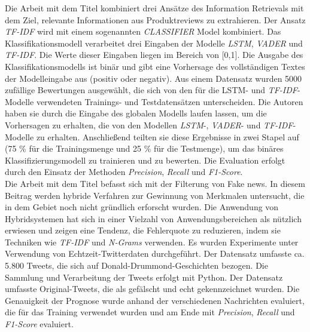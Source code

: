 Die Arbeit mit dem Titel \cite{chiny2021lstm} kombiniert drei Ansätze des Information Retrievals mit dem Ziel, relevante Informationen aus Produktreviews zu extrahieren. Der Ansatz \emph{TF-IDF} wird mit einem sogenannten \emph{CLASSIFIER} Model kombiniert. Das Klassifikationsmodell verarbeitet drei Eingaben der Modelle \emph{LSTM}, \emph{VADER} und \emph{TF-IDF}. Die Werte dieser Eingaben liegen im Bereich von [0,1]. Die Ausgabe des Klassifikationsmodells ist binär und gibt eine Vorhersage des vollständigen Textes der Modelleingabe aus (positiv oder negativ). Aus einem Datensatz wurden 5000 zufällige Bewertungen ausgewählt, die sich von den für die LSTM- und \emph{TF-IDF}-Modelle verwendeten Trainings- und Testdatensätzen unterscheiden. Die Autoren \citeauthor{chiny2021lstm} haben sie durch die Eingabe des globalen Modells laufen lassen, um die Vorhersagen zu erhalten, die von den Modellen \emph{LSTM}-, \emph{VADER}- und \emph{TF-IDF}-Modelle zu erhalten. Anschließend teilten sie diese Ergebnisse in zwei Stapel auf (75 \% für die Trainingsmenge und 25 \% für die Testmenge), um das binäres Klassifizierungsmodell zu trainieren und zu bewerten. Die Evaluation erfolgt durch den Einsatz der Methoden \emph{Precision}, \emph{Recall} und \emph{F1-Score}.\\

Die Arbeit mit dem Titel \cite{suhasini2021hybrid} befasst sich mit der Filterung von Fake news. In diesem Beitrag werden hybride Verfahren zur Gewinnung von Merkmalen untersucht, die in dem Gebiet noch nicht gründlich erforscht wurden. Die Anwendung von Hybridsystemen hat sich in einer Vielzahl von Anwendungsbereichen als nützlich erwiesen und zeigen eine Tendenz, die Fehlerquote zu reduzieren, indem sie Techniken wie \emph{TF-IDF} und \emph{N-Grams} verwenden. Es wurden Experimente unter Verwendung von Echtzeit-Twitterdaten durchgeführt. Der Datensatz umfasste ca. 5.800 Tweets, die sich auf Donald-Drummond-Geschichten bezogen. Die Sammlung und Verarbeitung der Tweets erfolgt mit Python. Der Datensatz umfasste Original-Tweets, die als gefälscht und echt gekennzeichnet wurden. Die Genauigkeit der Prognose wurde anhand der verschiedenen Nachrichten evaluiert, die für das Training verwendet wurden und am Ende mit \emph{Precision}, \emph{Recall} und \emph{F1-Score} evaluiert.\\

